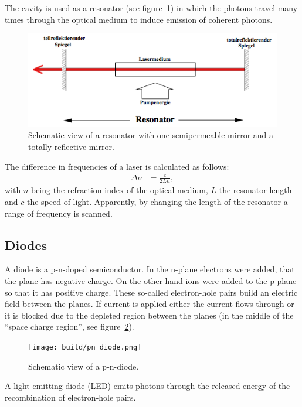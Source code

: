 The cavity is used as a resonator (see figure~\ref{fig:resonator}) in which the photons
travel many times through the optical medium to induce emission of coherent photons.

\begin{figure}[ht]
  \centering
  \includegraphics[width=0.8\linewidth]{content/resonator.png}
  \caption{Schematic view of a resonator with one semipermeable mirror and a totally reflective
  mirror\cite{anleitung_hene}.}%
  \label{fig:resonator}
\end{figure}

The difference in frequencies of a laser is calculated as follows:
\begin{align}\label{eq:free_spectral_range}
  \Delta \nu &= \frac{c}{2Ln},
\end{align}
with $n$ being the refraction index of the optical medium, $L$ the resonator length
and $c$ the speed of light.
Apparently, by changing the length of the resonator a range of frequency is scanned.


\subsection{Diodes}\label{diodes}

A diode is a p-n-doped semiconductor.
In the n-plane electrons were added, that the plane has negative charge.
On the other hand ions were added to the p-plane so that it has positive charge.
These so-called electron-hole pairs build an electric field between the planes.
If current is applied either the current flows through or it is blocked due to the depleted region
between the planes (in the middle of the \enquote{space charge region},
see figure~\ref{fig:depletion_region}).
\begin{figure}[ht]
  \centering
  \texttt{[image: build/pn\_diode.png]}
  \caption{Schematic view of a p-n-diode\cite{pn_diode_wiki}.}%
  \label{fig:depletion_region}
\end{figure}

A light emitting diode (LED) emits photons through the released energy
of the recombination of electron-hole pairs.

